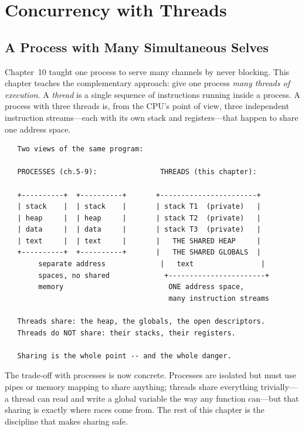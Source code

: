 
\chapter{Concurrency with Threads}

\section{A Process with Many Simultaneous Selves}

Chapter~10 taught one process to serve many channels by never blocking.
This chapter teaches the complementary approach: give one process
\emph{many threads of execution}. A \emph{thread} is a single sequence
of instructions running inside a process. A process with three threads
is, from the CPU's point of view, three independent instruction
streams---each with its own stack and registers---that happen to share
one address space.

\begin{verbatim}
   Two views of the same program:

   PROCESSES (ch.5-9):               THREADS (this chapter):

   +----------+  +----------+       +-----------------------+
   | stack    |  | stack    |       | stack T1  (private)   |
   | heap     |  | heap     |       | stack T2  (private)   |
   | data     |  | data     |       | stack T3  (private)   |
   | text     |  | text     |       |   THE SHARED HEAP     |
   +----------+  +----------+       |   THE SHARED GLOBALS  |
        separate address             |   text                |
        spaces, no shared             +-----------------------+
        memory                         ONE address space,
                                       many instruction streams

   Threads share: the heap, the globals, the open descriptors.
   Threads do NOT share: their stacks, their registers.

   Sharing is the whole point -- and the whole danger.
\end{verbatim}

The trade-off with processes is now concrete. Processes are isolated
but must use pipes or memory mapping to share anything; threads share
everything trivially---a thread can read and write a global variable
the way any function can---but that sharing is exactly where races
come from. The rest of this chapter is the discipline that makes
sharing safe.

